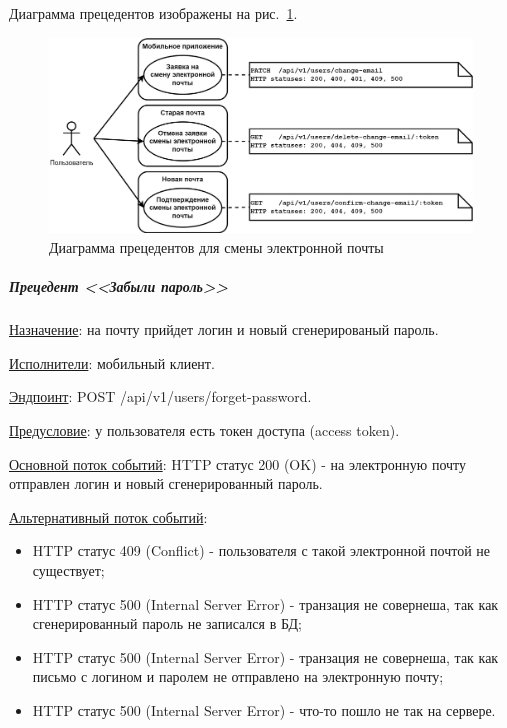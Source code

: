 Диаграмма прецедентов изображены на рис.~\ref{fig:UML_precedent_change_email}.


\begin{figure}[!htb]
    \centering

    \includegraphics[width=18cm]
    {images/UML/UML_precedent_change_email.png}

    \caption{Диаграмма прецедентов для смены электронной почты}

    \label{fig:UML_precedent_change_email}
\end{figure}


\subparagraph{Прецедент <<Забыли пароль>>} \hspace{0pt}

\underline{Назначение}: на почту прийдет логин и новый сгенерированый пароль.

\underline{Исполнители}: мобильный клиент.

\underline{Эндпоинт}: POST /api/v1/users/forget-password.

\underline{Предусловие}: у пользователя есть токен доступа (access token).

\underline{Основной поток событий}: HTTP статус 200 (OK) - на электронную почту отправлен логин и новый сгенерированный пароль.

\underline{Альтернативный поток событий}:

\begin{itemize}
    \item HTTP статус 409 (Conflict) - пользователя с такой электронной почтой не существует;
    \item HTTP статус 500 (Internal Server Error) - транзация не совернеша, так как сгенерированный пароль не записался в БД;
    \item HTTP статус 500 (Internal Server Error) - транзация не совернеша, так как письмо с логином и паролем не отправлено на электронную почту;
    \item HTTP статус 500 (Internal Server Error) - что-то пошло не так на сервере.
\end{itemize}

